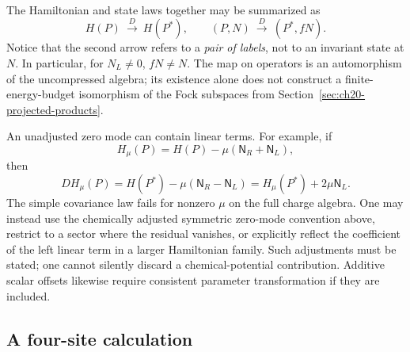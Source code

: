 The Hamiltonian and state laws together may be summarized as
\[
 H(P)\ \xrightarrow{\ D\ }\ H(P^*),\qquad
 (P,N)\ \xrightarrow{\ D\ }\ (P^*,fN).
\]
Notice that the second arrow refers to a \emph{pair of labels}, not
to an invariant state at $N$.  In particular, for $N_L\neq0$,
$fN\neq N$.  The map on operators is an automorphism of the
uncompressed algebra; its existence alone does not construct a
finite-energy-budget isomorphism of the Fock subspaces from
Section~\ref{sec:ch20-projected-products}.

\begin{remark}
\label{rem:ch20c-mu}
An unadjusted zero mode can contain linear terms.  For example, if
\[
 H_{\mu}(P)=H(P)-\mu(\mathsf N_R+\mathsf N_L),
\]
then
\[
 D H_{\mu}(P)
 =H(P^*)-\mu(\mathsf N_R-\mathsf N_L)
 =H_{\mu}(P^*)+2\mu\mathsf N_L.
\]
The simple covariance law fails for nonzero $\mu$ on the full
charge algebra.  One may instead use the chemically adjusted
symmetric zero-mode convention above, restrict to a sector where
the residual vanishes, or explicitly reflect the coefficient of the
left linear term in a larger Hamiltonian family.  Such adjustments
must be stated; one cannot silently discard a chemical-potential
contribution.  Additive scalar offsets likewise require consistent
parameter transformation if they are included.
\end{remark}

\subsection{A four-site calculation}
\label{subsec:ch20c-example}

